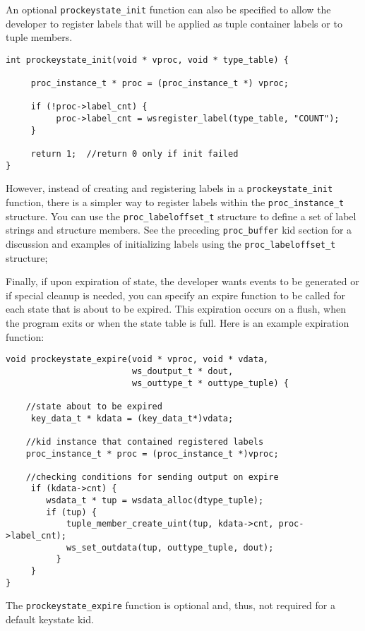 \documentclass[11pt]{article}
\begin{document}
An optional \texttt{prockeystate\_init} function can also be specified to allow
the developer to register labels that will be applied as tuple container labels
or to tuple members.

\begin{lstlisting}
int prockeystate_init(void * vproc, void * type_table) {

     proc_instance_t * proc = (proc_instance_t *) vproc;

     if (!proc->label_cnt) {
          proc->label_cnt = wsregister_label(type_table, "COUNT");
     }

     return 1;  //return 0 only if init failed
}
\end{lstlisting}

However, instead of creating and registering labels in a 
\texttt{prockeystate\_init} function, there is a simpler
way to register labels within the \texttt{proc\_instance\_t} structure.  
You can use the \texttt{proc\_labeloffset\_t} structure to define a set of 
label strings and structure members.  See the preceding \texttt{proc\_buffer} 
kid section for a discussion and examples of initializing labels using the 
\texttt{proc\_labeloffset\_t} structure;

Finally, if upon expiration of state, the developer wants events to be 
generated or if special cleanup is needed, you can specify an expire function 
to be called for each state that is about to be expired. This expiration occurs
on a flush, when  the program exits or when the state table is full.  Here is 
an example expiration function:

\begin{lstlisting}
void prockeystate_expire(void * vproc, void * vdata,
                         ws_doutput_t * dout,
                         ws_outtype_t * outtype_tuple) {

	//state about to be expired
     key_data_t * kdata = (key_data_t*)vdata;

	//kid instance that contained registered labels
	proc_instance_t * proc = (proc_instance_t *)vproc;

	//checking conditions for sending output on expire
     if (kdata->cnt) {
		wsdata_t * tup = wsdata_alloc(dtype_tuple);
		if (tup) {
			tuple_member_create_uint(tup, kdata->cnt, proc->label_cnt);
			ws_set_outdata(tup, outtype_tuple, dout);
          }
     }
}
\end{lstlisting}

The \texttt{prockeystate\_expire} function is optional and, thus, not required 
for a default keystate kid.
\end{document}
